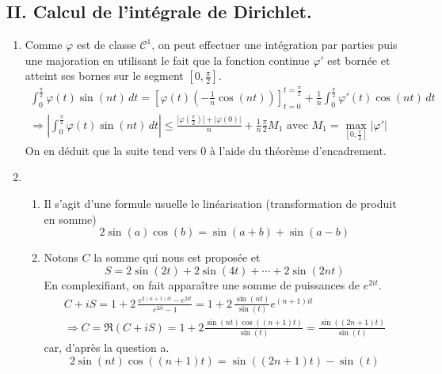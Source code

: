 \subsection*{II. Calcul de l'intégrale de Dirichlet.}
\begin{enumerate}
  \item Comme $\varphi$ est de classe $\mathcal{C}^1$, on peut effectuer une intégration par parties puis une majoration en utilisant le fait que la fonction continue $\varphi'$ est bornée et atteint ses bornes sur le segment $[0,\frac{\pi}{2}]$.
\begin{multline*}
\int_{0}^{\frac{\pi}{2}}\varphi(t)\sin(nt)\,dt
= \left[\varphi(t)\left(-\frac{1}{n}\cos (nt) \right)  \right]_{t=0}^{t=\frac{\pi}{2}}
+ \frac{1}{n}\int_0^{\frac{\pi}{2}}\varphi'(t)\cos(nt)\, dt \\
\Rightarrow
\left|\int_{0}^{\frac{\pi}{2}}\varphi(t)\sin(nt)\,dt\right|
\leq \frac{|\varphi(\frac{\pi}{2})|+|\varphi(0)|}{n}
+\frac{1}{n}\frac{\pi}{2}M_1
\text{ avec } M_1 = \max_{[0,\frac{\pi}{2}]}|\varphi'|
\end{multline*}
On en déduit que la suite tend vers $0$ à l'aide du théorème d'encadrement.

  \item 
\begin{enumerate}
  \item Il s'agit d'une formule usuelle le linéarisation (transformation de produit en somme)
\begin{displaymath}
2\sin(a) \cos(b) = \sin(a+b) + \sin(a-b)  
\end{displaymath}

  \item Notons $C$ la somme qui nous est proposée et 
\begin{displaymath}
S = 2\sin(2t) + 2\sin(4t) + \cdots + 2\sin(2nt)  
\end{displaymath}
En complexifiant, on fait apparaître une somme de puissances de $e^{2it}$.
\begin{multline*}
C+iS = 1 + 2 \, \frac{e^{2(n+1)it} - e^{2it}}{e^{2it} -1}
= 1 + 2 \,\frac{\sin(nt)}{\sin(t)}e^{(n+1)it} \\
\Rightarrow C = \Re(C+iS) = 1 +2\frac{\sin(nt)\cos((n+1)t)}{\sin(t)} = \frac{\sin((2n+1)t)}{\sin(t)}
\end{multline*}
car, d'après la question a.
\begin{displaymath}
2\sin(nt)\cos((n+1)t) = \sin((2n+1)t) - \sin(t)  
\end{displaymath}


\end{enumerate}
\end{enumerate}
